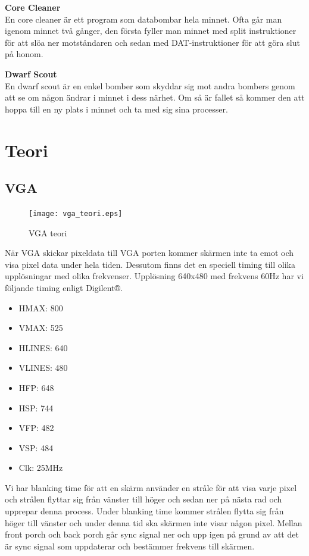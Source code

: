 \documentclass[11pt]{article}
\begin{document}
\textbf{Core Cleaner} \\
En core cleaner är ett program som databombar hela minnet. Ofta går man igenom minnet två gånger, den första fyller man minnet med split instruktioner för att slöa ner motståndaren och sedan med DAT-instruktioner för att göra slut på honom.

\textbf{Dwarf Scout} \\
En dwarf scout är en enkel bomber som skyddar sig mot andra bombers genom att se om någon ändrar i minnet i dess närhet. Om så är fallet så kommer den att hoppa till en ny plats i minnet och ta med sig sina processer.

\newpage

\section{Teori}

\subsection{VGA}

\begin{figure}[h]
    \begin{center}
        \texttt{[image: vga\_teori.eps]}
        \caption{VGA teori}
        \label{fig:vga_teori}
    \end{center}
\end{figure}

När VGA skickar pixeldata till VGA porten kommer skärmen inte ta emot och visa pixel data under hela tiden. Dessutom finns det en speciell timing till olika upplösningar med olika frekvenser. Upplösning 640x480 med frekvens 60Hz har vi följande timing enligt Digilent®.

\begin{itemize}
    \item HMAX: 800
    \item VMAX: 525
    \item HLINES: 640
    \item VLINES: 480
    \item HFP: 648
    \item HSP: 744
    \item VFP: 482
    \item VSP: 484
    \item Clk: 25MHz
\end{itemize}

Vi har blanking time för att en skärm använder en stråle för att visa varje pixel och strålen flyttar sig från vänster till höger och sedan ner på nästa rad och upprepar denna process. Under blanking time kommer strålen flytta sig från höger till vänster och under denna tid ska skärmen inte visar någon pixel. Mellan front porch och back porch går sync signal ner och upp igen på grund av att det är sync signal som uppdaterar och bestämmer frekvens till skärmen.
\end{document}
